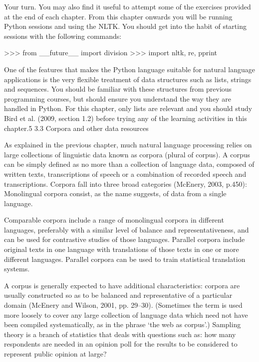 
Your turn. You may also find it useful to attempt some of the exercises provided at
the end of each chapter.
From this chapter onwards you will be running Python sessions and using the NLTK.
You should get into the habit of starting sessions with the following commands:

>>> from __future__ import division
>>> import nltk, re, pprint

One of the features that makes the Python language suitable for natural language
applications is the very flexible treatment of data structures such as lists, strings and
sequences. You should be familiar with these structures from previous programming
courses, but should ensure you understand the way they are handled in Python. For
this chapter, only lists are relevant and you should study Bird et al. (2009, section
1.2) before trying any of the learning activities in this chapter.5
3.3 Corpora and other data resources

As explained in the previous chapter, much natural language processing relies on
large collections of linguistic data known as corpora (plural of corpus). A corpus can
be simply defined as no more than a collection of language data, composed of
written texts, transcriptions of speech or a combination of recorded speech and
transcriptions.
Corpora fall into three broad categories (McEnery, 2003, p.450):
Monolingual corpora consist, as the name suggests, of data from a single
language.

Comparable corpora include a range of monolingual corpora in different
languages, preferably with a similar level of balance and representativeness, and
can be used for contrastive studies of those languages.
Parallel corpora include original texts in one language with translations of those
texts in one or more different languages. Parallel corpora can be used to train
statistical translation systems.

A corpus is generally expected to have additional characteristics: corpora are usually
constructed so as to be balanced and representative of a particular domain (McEnery
and Wilson, 2001, pp. 29–30). (Sometimes the term is used more loosely to cover
any large collection of language data which need not have been compiled
systematically, as in the phrase ‘the web as corpus’.) Sampling theory is a branch of
statistics that deals with questions such as: how many respondents are needed in an
opinion poll for the results to be considered to represent public opinion at large?

